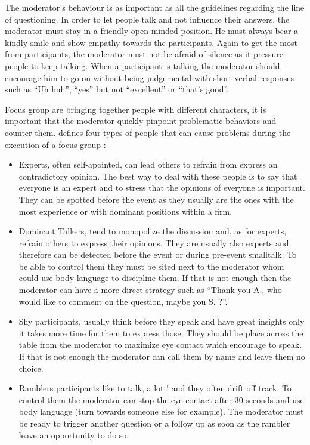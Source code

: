 \documentclass[10pt]{report}
\begin{document}
The moderator's behaviour is as important as all the guidelines regarding the line of questioning. In order to let people talk and not influence their answers, the moderator must stay in a friendly open-minded position. He must always bear a kindly smile and show empathy towards the participants. Again to get the most from participants, the moderator must not be afraid of silence as it pressure people to keep talking. When a participant is talking the moderator should encourage him to go on without being judgemental with short verbal responses such as \enquote{Uh huh}, \enquote{yes} but not \enquote{excellent} or \enquote{that's good}.

Focus group are bringing together people with different characters, it is important that the moderator quickly pinpoint problematic behaviors and counter them. \autocite{Krueger2000} defines four types of people that can cause problems during the execution of a focus group :
\begin{itemize}
\item Experts, often self-apointed, can lead others to refrain from express an contradictory opinion. The best way to deal with these people is to say that everyone is an expert and to stress that the opinions of everyone is important. They can be spotted before the event as they usually are the ones with the most experience or with dominant positions within a firm.
\item Dominant Talkers, tend to monopolize the discussion and, as for experts, refrain others to express their opinions. They are usually also experts and therefore can be detected before the event or during pre-event smalltalk. To be able to control them they must be sited next to the moderator whom could use body language to discipline them. If that is not enough then the moderator can have a more direct strategy such as \enquote{Thank you A., who would like to comment on the question, maybe you S. ?}.
\item Shy participants, usually think before they speak and have great insights only it takes more time for them to express those. They should be place across the table from the moderator to maximize eye contact which encourage to speak. If that is not enough the moderator can call them by name and leave them no choice.
\item Ramblers participants like to talk, a lot ! and they often drift off track. To control them the moderator can stop the eye contact after 30 seconds and use body language (turn towards someone else for example). The moderator must be ready to trigger another question or a follow up as soon as the rambler leave an opportunity to do so.
\end{itemize}
\end{document}

